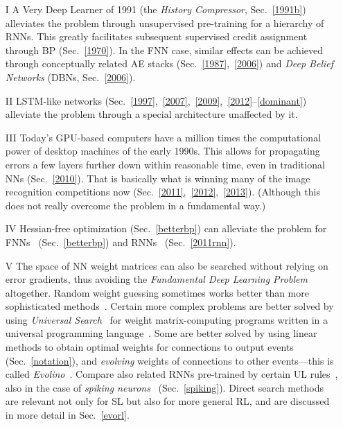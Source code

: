 \documentclass[letterpaper]{article}
\begin{document}
\begin{sloppypar}
\begin{itemize}
\item[I]
A Very Deep Learner of 1991 (the {\em History Compressor}, Sec.~\ref{1991b}) alleviates the problem through unsupervised pre-training for a hierarchy of RNNs. This greatly facilitates subsequent supervised credit assignment through BP (Sec.~\ref{1970}).
In the FNN case, similar effects can be achieved through conceptually related AE stacks (Sec.~\ref{1987},~\ref{2006}) and {\em Deep Belief Networks} (DBNs, Sec.~\ref{2006}).

\item[II]
LSTM-like networks (Sec.~\ref{1997},~\ref{2007},~\ref{2009},~\ref{2012}--\ref{dominant}) alleviate
 the problem through a special architecture unaffected by it.

\item[III]
Today's
GPU-based computers have a million times the computational power of desktop machines  of the early 1990s. 
This
allows for propagating errors a few layers further down within reasonable time, 
even in traditional NNs (Sec.~\ref{2010}). That is basically what is winning many of the image 
recognition competitions now (Sec.~\ref{2011},~\ref{2012},~\ref{2013}). (Although this does not really overcome the problem in a fundamental way.) 

\item[IV] 
Hessian-free optimization (Sec.~\ref{betterbp})
can alleviate the problem for FNNs~\citep{Moller:93,Pearlmutter:93,schraudolph02,icml2010_094} (Sec.~\ref{betterbp})
and RNNs~\citep{Martens:2011hessfree} (Sec.~\ref{2011rnn}).

\item[V] The space of NN weight matrices can also be searched without relying on error gradients,
thus avoiding the {\em Fundamental Deep Learning Problem} altogether.
Random weight guessing sometimes works better
than more sophisticated methods~\citep{Hochreiter:96sintra}.
Certain more complex problems are better solved by using 
{\em Universal Search}~\citep{Levin:73} for weight matrix-computing programs written in
a universal programming language~\citep{Schmidhuber:97nn+}.
Some are better solved by using linear methods 
to obtain optimal weights for connections to output events (Sec.~\ref{notation}),
and  {\em evolving} weights of connections to other events---this is called {\em Evolino}~\citep{Schmidhuber:07nc}.
Compare also related RNNs pre-trained by certain UL rules~\citep{steil2007},
also in the case of {\em spiking  neurons}~\citep{yin2012,maass2013} (Sec.~\ref{spiking}).
Direct search methods are relevant not only for SL but also for more general RL,
and are discussed in more detail in Sec.~\ref{evorl}.




\end{itemize}
\end{sloppypar}
\end{document}
